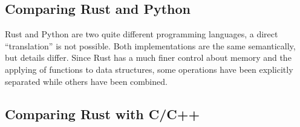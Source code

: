 





\subsection{Comparing Rust and Python}\label{sec:rustvspython}

Rust and Python are two quite different programming languages, a direct
``translation'' is not possible. Both implementations are the same semantically,
but details differ. Since Rust has a much finer control about memory and the
applying of functions to data structures, some operations have been explicitly
separated while others have been combined.

\subsection{Comparing Rust with C/C++}\label{sec:rustvscc++}











